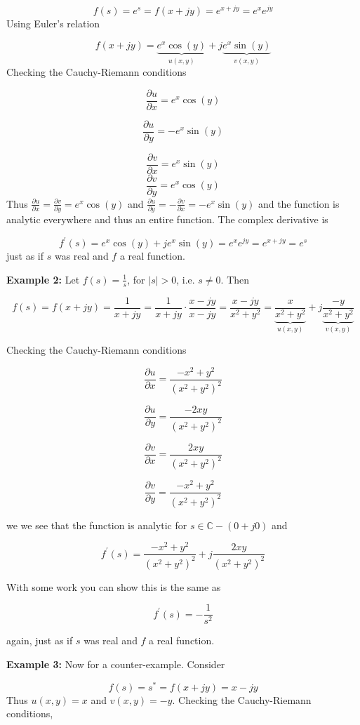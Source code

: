 \documentclass{article}
\begin{document}
\[
f(s) = e^s = f(x+jy) = e^{x+jy} = e^x e^{jy}
\]
Using Euler's relation

\[
f(x+jy) = \underbrace{e^x\cos(y)}_{u(x,y)} + j\underbrace{e^x \sin(y)}_{v(x,y)}
\]
Checking the Cauchy-Riemann conditions

\[
\frac{\partial u}{\partial x} = e^x\cos(y)
\]

\[
\frac{\partial u}{\partial y} = -e^x\sin(y)
\]

\[
\frac{\partial v}{\partial x} = e^x\sin(y)
\]
\[
\frac{\partial v}{\partial y} = e^x\cos(y)
\]
Thus $\frac{\partial u}{\partial x} = \frac{\partial v}{\partial y} = e^x\cos(y)$ and $\frac{\partial u}{\partial y} = -\frac{\partial v}{\partial x} = -e^x\sin(y)$ and the function is analytic everywhere and thus an entire function. The complex derivative is

\[
f^\prime(s) = e^x\cos(y) + je^x\sin(y) = e^x e^{jy} = e^{x+jy} = e^s
\]
just as if $s$ was real and $f$ a real function.

\textbf{Example 2:} Let $f(s) = \frac{1}{s}$, for $|s| > 0$, i.e. $s \neq 0$. Then

\[
f(s) = f(x+jy) = \frac{1}{x+jy} = \frac{1}{x+jy} \cdot \frac{x-jy}{x-jy} = \frac{x-jy}{x^2 + y^2} = \underbrace{\frac{x}{x^2 + y^2}}_{u(x,y)} + j \underbrace{\frac{-y}{x^2 + y^2}}_{v(x,y)}
\]

Checking the Cauchy-Riemann conditions

\[
\frac{\partial u}{\partial x} = \frac{-x^2 + y^2}{(x^2 + y^2)^2}
\]

\[
\frac{\partial u}{\partial y} = \frac{-2xy}{(x^2 + y^2)^2}
\]

\[
\frac{\partial v}{\partial x} = \frac{2xy}{(x^2 + y^2)^2}
\]

\[
\frac{\partial v}{\partial y} = \frac{-x^2 + y^2}{(x^2 + y^2)^2}
\]

we we see that the function is analytic for $s \in \mathbb{C} - (0 + j0)$ and

\[
f^\prime(s) = \frac{-x^2 + y^2}{(x^2 + y^2)^2} + j \frac{2xy}{(x^2 + y^2)^2}
\]

With some work you can show this is the same as

\[
f^\prime(s) = -\frac{1}{s^2}
\]

again, just as if $s$ was real and $f$ a real function.

\textbf{Example 3:} Now for a counter-example. Consider

\[
f(s) = s^* = f(x + jy) = x - jy
\]
Thus $u(x,y) = x$ and $v(x,y) = -y$. Checking the Cauchy-Riemann conditions,
\end{document}
